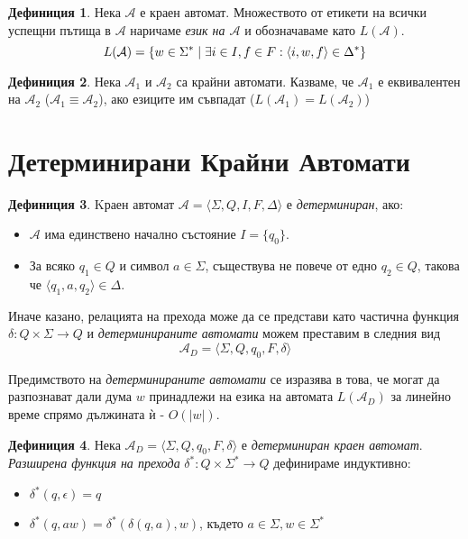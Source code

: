 \documentclass[11pt, oneside]{article}
\theoremstyle{definition}
\newtheorem{definition}{Дефиниция}[section]
\begin{document}
\begin{definition} 
	Нека \( \mathcal{A} \) е краен автомат. Множеството от етикети на всички успещни пътища в \( \mathcal{A} \) наричаме \emph{език на \( \mathcal{A} \)} и обозначаваме като \( L(\mathcal{A}) \). \[ L(\mathcal{A}) = \{ w \in \Sigma^* \hspace{0.1cm} | \hspace{0.1cm} \exists i \in I, f \in F : \langle i, w, f \rangle \in \Delta^* \} \]
\end{definition}

\begin{definition} 
	Нека \( \mathcal{A}_1 \) и \( \mathcal{A}_2 \) са крайни автомати. Казваме, че \( \mathcal{A}_1 \) е еквивалентен на \( \mathcal{A}_2 \) (\( \mathcal{A}_1 \equiv \mathcal{A}_2 \)), ако езиците им съвпадат (\( L(\mathcal{A}_1) = L(\mathcal{A}_2) \))
\end{definition}

\section{Детерминирани Крайни Автомати}

\begin{definition}
	Kраен автомат \( \mathcal{A} = \langle \Sigma, Q, I, F, \Delta \rangle \) е \emph{детерминиран}, ако:

	\begin{itemize}
		\item \( \mathcal{A} \) има единствено начално състояние \(I = \{q_0\}\).
		\item За всяко \( q_1 \in Q \) и символ \( a \in \Sigma \), съществува не повече от едно \( q_2 \in Q \), такова че \( \langle q_1, a, q_2 \rangle \in \Delta \).
	\end{itemize} 

	\noindent Иначе казано, релацията на прехода може да се представи като частична функция \( \delta: Q \times \Sigma \to Q \) и \emph{детерминираните автомати} можем преставим в следния вид \[ \mathcal{A}_D = \langle \Sigma, Q, q_0, F, \delta \rangle \]

	Предимството на \emph{детерминираните автомати} се изразява в това, че могат да разпознават дали дума \( w \) принадлежи на езика на автомата \( L(\mathcal{A}_D) \) за линейно време спрямо дължината ѝ - \( O(|w|) \).
\end{definition}

\begin{definition}
	Нека \( \mathcal{A}_D = \langle \Sigma, Q, q_0, F, \delta \rangle \) е \emph{детерминиран краен автомат}. \emph{Разширена функция на прехода} \( \delta^*: Q \times \Sigma^* \to Q \) дефинираме индуктивно:

	\begin{itemize}
		\item \( \delta^*(q, \epsilon) = q \)
		\item \( \delta^*(q, aw) = \delta^*(\delta(q, a), w) \), където \( a \in \Sigma, w \in \Sigma^* \)
	\end{itemize}
\end{definition}
\end{document}
